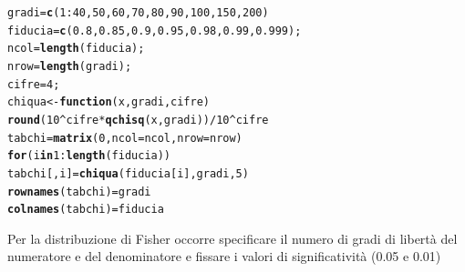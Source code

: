 \documentclass[onecolumn,12pt]{book}\usepackage[]{graphicx}\usepackage[]{color}
\makeatletter
\newcommand{\hlnum}[1]{\textcolor[rgb]{0.686,0.059,0.569}{#1}}%
\newcommand{\hlopt}[1]{\textcolor[rgb]{0,0,0}{#1}}%
\newcommand{\hlstd}[1]{\textcolor[rgb]{0.345,0.345,0.345}{#1}}%
\newcommand{\hlkwa}[1]{\textcolor[rgb]{0.161,0.373,0.58}{\textbf{#1}}}%
\newcommand{\hlkwb}[1]{\textcolor[rgb]{0.69,0.353,0.396}{#1}}%
\newcommand{\hlkwc}[1]{\textcolor[rgb]{0.333,0.667,0.333}{#1}}%
\newcommand{\hlkwd}[1]{\textcolor[rgb]{0.737,0.353,0.396}{\textbf{#1}}}%
\newenvironment{kframe}{%
 \def\at@end@of@kframe{}%
 \ifinner\ifhmode%
  \def\at@end@of@kframe{\end{minipage}}%
  \begin{minipage}{\columnwidth}%
 \fi\fi%
 \def\FrameCommand##1{\hskip\@totalleftmargin \hskip-\fboxsep
 \colorbox{shadecolor}{##1}\hskip-\fboxsep
     \hskip-\linewidth \hskip-\@totalleftmargin \hskip\columnwidth}%
 \MakeFramed {\advance\hsize-\width
   \@totalleftmargin\z@ \linewidth\hsize
   \@setminipage}}%
 {\par\unskip\endMakeFramed%
 \at@end@of@kframe}
\newenvironment{knitrout}{}{} %
\makeatother
\begin{document}
\begin{knitrout}
\color{fgcolor}\begin{kframe}
\begin{alltt}
\hlstd{gradi}\hlkwb{=}\hlkwd{c}\hlstd{(}\hlnum{1}\hlopt{:}\hlnum{40}\hlstd{,}\hlnum{50}\hlstd{,}\hlnum{60}\hlstd{,}\hlnum{70}\hlstd{,}\hlnum{80}\hlstd{,}\hlnum{90}\hlstd{,}\hlnum{100}\hlstd{,}\hlnum{150}\hlstd{,}\hlnum{200}\hlstd{)}
\hlstd{fiducia}\hlkwb{=}\hlkwd{c}\hlstd{(}\hlnum{0.8}\hlstd{,}\hlnum{0.85}\hlstd{,}\hlnum{0.9}\hlstd{,}\hlnum{0.95}\hlstd{,}\hlnum{0.98}\hlstd{,}\hlnum{0.99}\hlstd{,}\hlnum{0.999}\hlstd{);}
\hlstd{ncol}\hlkwb{=}\hlkwd{length}\hlstd{(fiducia);}
\hlstd{nrow}\hlkwb{=}\hlkwd{length}\hlstd{(gradi);}
\hlstd{cifre}\hlkwb{=}\hlnum{4}\hlstd{;}
\hlstd{chiqua}\hlkwb{<-}\hlkwa{function}\hlstd{(}\hlkwc{x}\hlstd{,}\hlkwc{gradi}\hlstd{,}\hlkwc{cifre}\hlstd{)}
\hlkwd{round}\hlstd{(}\hlnum{10}\hlopt{^}\hlstd{cifre}\hlopt{*}\hlkwd{qchisq}\hlstd{(x,gradi))}\hlopt{/}\hlnum{10}\hlopt{^}\hlstd{cifre}
\hlstd{tabchi}\hlkwb{=}\hlkwd{matrix}\hlstd{(}\hlnum{0}\hlstd{,}\hlkwc{ncol}\hlstd{=ncol,}\hlkwc{nrow}\hlstd{=nrow)}
\hlkwa{for} \hlstd{(i} \hlkwa{in} \hlnum{1}\hlopt{:}\hlkwd{length}\hlstd{(fiducia))}
\hlstd{tabchi[,i]}\hlkwb{=}\hlkwd{chiqua}\hlstd{(fiducia[i],gradi,}\hlnum{5}\hlstd{)}
\hlkwd{rownames}\hlstd{(tabchi)}\hlkwb{=}\hlstd{gradi}
\hlkwd{colnames}\hlstd{(tabchi)}\hlkwb{=}\hlstd{fiducia}
\end{alltt}
\end{kframe}
\end{knitrout}

Per la  distribuzione di Fisher occorre specificare il numero di gradi di libertà del numeratore e del denominatore e fissare i valori di significatività (0.05 e 0.01)
\end{document}
